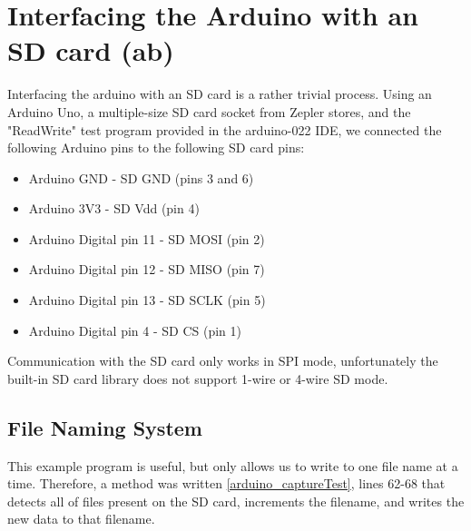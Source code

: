 \section{Interfacing the Arduino with an SD card (ab)}
\label{sec:SD_imp}

Interfacing the arduino with an SD card is a rather trivial process. Using an Arduino Uno, a multiple-size SD card socket from Zepler stores, and the 
"ReadWrite" test program provided in the arduino-022 IDE, we connected the following Arduino pins to the following SD card pins:

\begin{itemize}
\item Arduino GND - SD GND (pins 3 and 6)
\item Arduino 3V3 - SD Vdd (pin 4)
\item Arduino Digital pin 11 - SD MOSI (pin 2)
\item Arduino Digital pin 12 - SD MISO (pin 7)
\item Arduino Digital pin 13 - SD SCLK (pin 5)
\item Arduino Digital pin 4 - SD CS (pin 1)
\end{itemize}

Communication with the SD card only works in SPI mode, unfortunately the built-in 
SD card library does not support 1-wire or 4-wire SD mode.

\subsection{File Naming System}

This example program is useful, but only allows us to write to one file name at 
a time. Therefore, a method was written \ref{arduino_captureTest}, lines 62-68 that detects all of files present on the SD card, increments the filename, and 
writes the new data to that filename.
